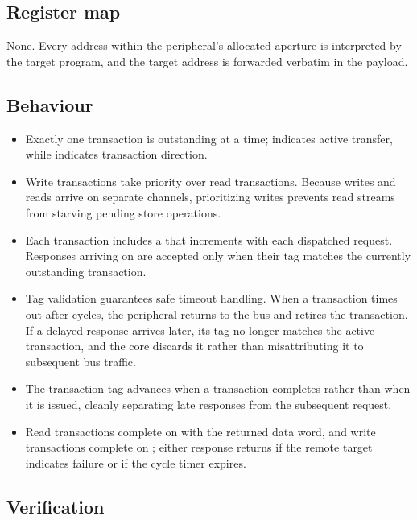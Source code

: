 \subsection*{Register map}

None. Every address within the peripheral's allocated aperture is interpreted
by the target program, and the target address is forwarded verbatim in the
 payload.


\subsection*{Behaviour}

\begin{itemize}
\item Exactly one transaction is outstanding at a time;  indicates
active transfer, while  indicates transaction direction.
\item Write transactions take priority over read transactions. Because writes
and reads arrive on separate channels, prioritizing writes prevents read streams
from starving pending store operations.
\item Each transaction includes a  that increments with each dispatched
request. Responses arriving on  are accepted only when their tag matches
the currently outstanding transaction.
\item Tag validation guarantees safe timeout handling. When a transaction times
out after  cycles, the peripheral returns  to the bus and
retires the transaction. If a delayed response arrives later, its tag no longer
matches the active transaction, and the core discards it rather than misattributing
it to subsequent bus traffic.
\item The transaction tag advances when a transaction completes rather than when
it is issued, cleanly separating late responses from the subsequent request.
\item Read transactions complete on  with the returned data word,
and write transactions complete on ; either response returns
 if the remote target indicates failure or if the cycle timer expires.
\end{itemize}

\subsection*{Verification}

